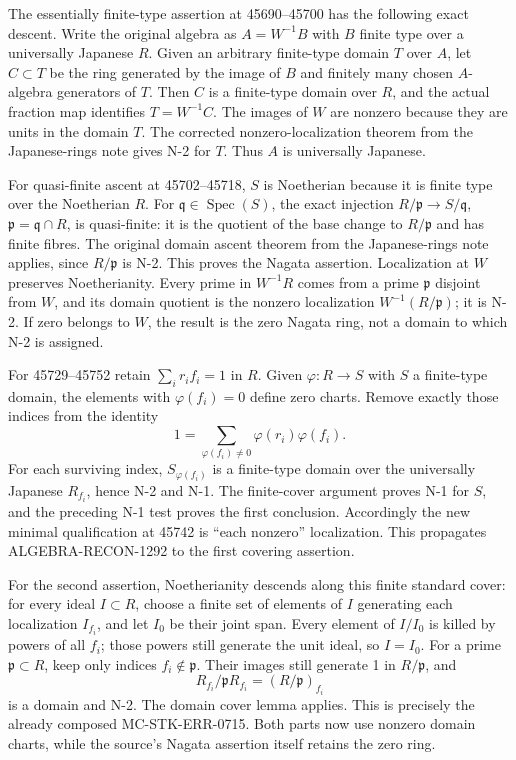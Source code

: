 The essentially finite-type assertion at 45690--45700 has the following exact descent. Write the original algebra as \(A=W^{-1}B\) with \(B\) finite type over a universally Japanese \(R\). Given an arbitrary finite-type domain \(T\) over \(A\), let \(C\subset T\) be the ring generated by the image of \(B\) and finitely many chosen \(A\)-algebra generators of \(T\). Then \(C\) is a finite-type domain over \(R\), and the actual fraction map identifies \(T=W^{-1}C\). The images of \(W\) are nonzero because they are units in the domain \(T\). The corrected nonzero-localization theorem from the Japanese-rings note gives N-2 for \(T\). Thus \(A\) is universally Japanese.

For quasi-finite ascent at 45702--45718, \(S\) is Noetherian because it is finite type over the Noetherian \(R\). For \(\mathfrak q\in\operatorname{Spec}(S)\), the exact injection \(R/\mathfrak p\to S/\mathfrak q\), \(\mathfrak p=\mathfrak q\cap R\), is quasi-finite: it is the quotient of the base change to \(R/\mathfrak p\) and has finite fibres. The original domain ascent theorem from the Japanese-rings note applies, since \(R/\mathfrak p\) is N-2. This proves the Nagata assertion. Localization at \(W\) preserves Noetherianity. Every prime in \(W^{-1}R\) comes from a prime \(\mathfrak p\) disjoint from \(W\), and its domain quotient is the nonzero localization \(W^{-1}(R/\mathfrak p)\); it is N-2. If zero belongs to \(W\), the result is the zero Nagata ring, not a domain to which N-2 is assigned.

For 45729--45752 retain \(\sum_i r_i f_i=1\) in \(R\). Given \(\varphi:R\to S\) with \(S\) a finite-type domain, the elements with \(\varphi(f_i)=0\) define zero charts. Remove exactly those indices from the identity \[
 1=\sum_{\varphi(f_i)\ne0}\varphi(r_i)\varphi(f_i).
\] For each surviving index, \(S_{\varphi(f_i)}\) is a finite-type domain over the universally Japanese \(R_{f_i}\), hence N-2 and N-1. The finite-cover argument proves N-1 for \(S\), and the preceding N-1 test proves the first conclusion. Accordingly the new minimal qualification at 45742 is ``each nonzero'' localization. This propagates ALGEBRA-\AlgebraIdentifierBreak{}RECON-\AlgebraIdentifierBreak{}1292 to the first covering assertion.

For the second assertion, Noetherianity descends along this finite standard cover: for every ideal \(I\subset R\), choose a finite set of elements of \(I\) generating each localization \(I_{f_i}\), and let \(I_0\) be their joint span. Every element of \(I/I_0\) is killed by powers of all \(f_i\); those powers still generate the unit ideal, so \(I=I_0\). For a prime \(\mathfrak p\subset R\), keep only indices \(f_i\notin\mathfrak p\). Their images still generate 1 in \(R/\mathfrak p\), and \[
 R_{f_i}/\mathfrak pR_{f_i}=(R/\mathfrak p)_{f_i}
\] is a domain and N-2. The domain cover lemma applies. This is precisely the already composed MC-\AlgebraIdentifierBreak{}STK-\AlgebraIdentifierBreak{}ERR-\AlgebraIdentifierBreak{}0715. Both parts now use nonzero domain charts, while the source's Nagata assertion itself retains the zero ring.

